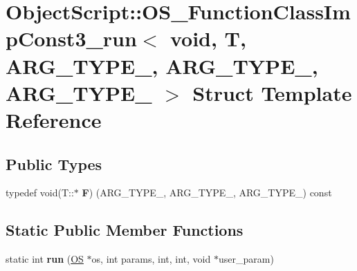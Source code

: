 \hypertarget{struct_object_script_1_1_o_s___function_class_imp_const3__run_3_01void_00_01_t_00_01_01_01_a_r_g6508fd147b7a30c3e8093407fd16b579}{}\section{Object\+Script\+:\+:O\+S\+\_\+\+Function\+Class\+Imp\+Const3\+\_\+run$<$ void, T, A\+R\+G\+\_\+\+T\+Y\+P\+E\+\_, A\+R\+G\+\_\+\+T\+Y\+P\+E\+\_, A\+R\+G\+\_\+\+T\+Y\+P\+E\+\_ $>$ Struct Template Reference}
\label{struct_object_script_1_1_o_s___function_class_imp_const3__run_3_01void_00_01_t_00_01_01_01_a_r_g6508fd147b7a30c3e8093407fd16b579}
\subsection*{Public Types}
\begin{DoxyCompactItemize}
\item 
typedef void(T\+::$\ast$ {\bfseries F}) (A\+R\+G\+\_\+\+T\+Y\+P\+E\+\_, A\+R\+G\+\_\+\+T\+Y\+P\+E\+\_, A\+R\+G\+\_\+\+T\+Y\+P\+E\+\_) const \hypertarget{struct_object_script_1_1_o_s___function_class_imp_const3__run_3_01void_00_01_t_00_01_01_01_a_r_g6508fd147b7a30c3e8093407fd16b579_a6321b2052d12b813d14f62044acee16e}{}\label{struct_object_script_1_1_o_s___function_class_imp_const3__run_3_01void_00_01_t_00_01_01_01_a_r_g6508fd147b7a30c3e8093407fd16b579_a6321b2052d12b813d14f62044acee16e}

\end{DoxyCompactItemize}
\subsection*{Static Public Member Functions}
\begin{DoxyCompactItemize}
\item 
static int {\bfseries run} (\hyperlink{class_object_script_1_1_o_s}{OS} $\ast$os, int params, int, int, void $\ast$user\+\_\+param)\hypertarget{struct_object_script_1_1_o_s___function_class_imp_const3__run_3_01void_00_01_t_00_01_01_01_a_r_g6508fd147b7a30c3e8093407fd16b579_adc788e716e3850f6b697c879f37dca3a}{}\label{struct_object_script_1_1_o_s___function_class_imp_const3__run_3_01void_00_01_t_00_01_01_01_a_r_g6508fd147b7a30c3e8093407fd16b579_adc788e716e3850f6b697c879f37dca3a}

\end{DoxyCompactItemize}


